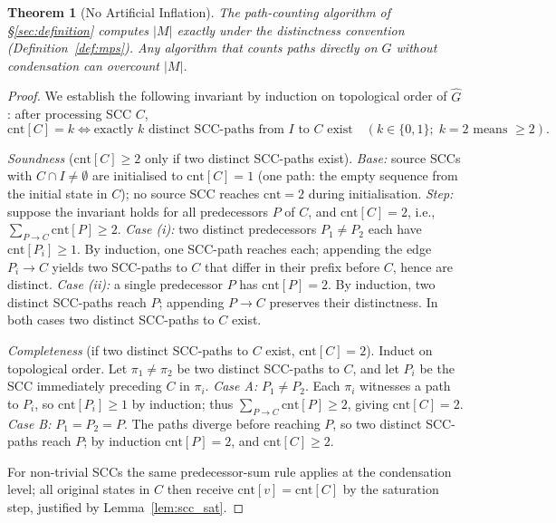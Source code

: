 \documentclass[11pt,letterpaper]{article}
\theoremstyle{plain}
\newtheorem{theorem}{Theorem}
\theoremstyle{definition}
\theoremstyle{remark}
\newcommand{\Ghat}{\hat{G}}
\begin{document}
\begin{theorem}[No Artificial Inflation]
  \label{thm:no_inflate}
  The path-counting algorithm of \S\ref{sec:definition} computes $|M|$
  exactly under the distinctness convention (Definition~\ref{def:mps}).
  Any algorithm that counts paths directly on $G$ without condensation
  can overcount $|M|$.
\end{theorem}
\begin{proof}
  We establish the following invariant by induction on topological order
  of $\Ghat$: after processing SCC $C$,
  \[
    \mathrm{cnt}[C] = k \iff
    \text{exactly } k \text{ distinct SCC-paths from }I\text{ to }C\text{ exist}
    \quad (k \in \{0,1\};\; k{=}2 \text{ means } {\geq}2).
  \]

  \emph{Soundness} ($\mathrm{cnt}[C] \geq 2$ only if two distinct SCC-paths exist).
  \emph{Base:} source SCCs with $C \cap I \neq \emptyset$ are initialised
  to $\mathrm{cnt}[C] = 1$ (one path: the empty sequence from the initial
  state in $C$); no source SCC reaches $\mathrm{cnt} = 2$ during
  initialisation.
  \emph{Step:} suppose the invariant holds for all predecessors $P$ of $C$,
  and $\mathrm{cnt}[C] = 2$, i.e., $\sum_{P \to C} \mathrm{cnt}[P] \geq 2$.
  \emph{Case (i):} two distinct predecessors $P_1 \neq P_2$ each have
  $\mathrm{cnt}[P_i] \geq 1$.
  By induction, one SCC-path reaches each; appending the edge $P_i \to C$
  yields two SCC-paths to $C$ that differ in their prefix before $C$,
  hence are distinct.
  \emph{Case (ii):} a single predecessor $P$ has $\mathrm{cnt}[P] = 2$.
  By induction, two distinct SCC-paths reach $P$; appending $P \to C$
  preserves their distinctness.
  In both cases two distinct SCC-paths to $C$ exist.

  \emph{Completeness} (if two distinct SCC-paths to $C$ exist,
  $\mathrm{cnt}[C] = 2$).
  Induct on topological order.
  Let $\pi_1 \neq \pi_2$ be two distinct SCC-paths to $C$, and let
  $P_i$ be the SCC immediately preceding $C$ in $\pi_i$.
  \emph{Case A:} $P_1 \neq P_2$.
  Each $\pi_i$ witnesses a path to $P_i$, so $\mathrm{cnt}[P_i] \geq 1$
  by induction; thus $\sum_{P \to C} \mathrm{cnt}[P] \geq 2$,
  giving $\mathrm{cnt}[C] = 2$.
  \emph{Case B:} $P_1 = P_2 = P$.
  The paths diverge before reaching $P$, so two distinct SCC-paths reach
  $P$; by induction $\mathrm{cnt}[P] = 2$, and $\mathrm{cnt}[C] \geq 2$.

  For non-trivial SCCs the same predecessor-sum rule applies at the
  condensation level; all original states in $C$ then receive
  $\mathrm{cnt}[v] = \mathrm{cnt}[C]$ by the saturation step,
  justified by Lemma~\ref{lem:scc_sat}.


\end{proof}
\end{document}
